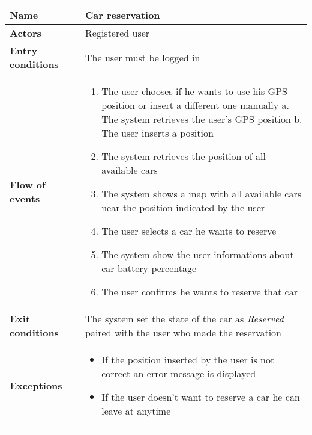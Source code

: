 \begin{tabular}{p{0.25\linewidth}p{0.75\linewidth}}
\toprule
\textbf{Name} & \textbf{Car reservation} \\
\midrule
\textbf{Actors} &  Registered user \\
\midrule
\textbf{Entry conditions} & The user must be logged in \\
\midrule
\textbf{Flow of events} & 
\begin{enumerate}
	\item The user chooses if he wants to use his GPS position or insert a different one manually
		\subitem a. The system retrieves the user's  GPS position
		\subitem b. The user inserts a position
	\item The system retrieves the position of all available cars
	\item The system shows a map with all available cars near the position indicated by the user
	\item The user selects a car he wants to reserve
	\item The system show the user informations about car battery percentage
	\item The user confirms he wants to reserve that car
\end{enumerate} \\
\midrule
\textbf{Exit conditions} & The system set the state of the car as \emph{Reserved} paired with the user who made the reservation\\
\midrule
\textbf{Exceptions} & 
\begin{itemize}
	\item If the position inserted by the user is not correct an error message is displayed
	\item If the user doesn't want to reserve a car he can leave at anytime
\end{itemize} \\
\bottomrule
\end{tabular}

